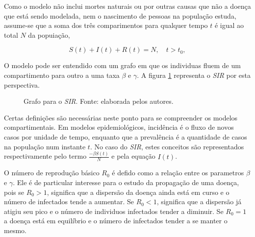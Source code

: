 Como o modelo não inclui mortes naturais ou por outras causas que não a doença
que está sendo modelada, nem o nascimento de pessoas na população estuda, assume-se
que a soma dos três comparimentos para qualquer tempo $t$ é igual ao total 
$N$ da popuiação,

\begin{equation}
   S(t) + I(t) + R(t) = N,  \quad t > t_0, \label{eq:SIR-4}
\end{equation}

O modelo pode ser entendido com um grafo em que os individuas fluem de um 
compartimento para outro a uma taxa $\beta$ e $\gamma$. 
A figura \ref{fig:sir-grafo} representa o \textit{SIR} por esta perspectiva.

\begin{figure}
\centering
{}
\caption{Grafo para o \textit{SIR}. Fonte: elaborada pelos autores.}
\label{fig:sir-grafo}
\end{figure}

Certas definições são necessárias neste ponto para se compreender os modelos compartimentais. 
Em modelos epidemiológicos, incidência é o fluxo de novos casos por unidade de tempo,
enquanto que a prevalência é a quantidade de casos na população num instante $t$.
No caso do \textit{SIR}, estes conceitos são representados respectivamente pelo
termo $\frac{-\beta S(t)}{N}$ e pela equação $I(t)$. 

O número de reprodução básico $R_0$ é defido como a relação entre os parametros
$\beta$ e $\gamma$. Ele é de particular interesse para o estudo da propagação
de uma doença, pois se $R_0 > 1$, significa que a dispersão da doença
ainda está em curso e o número de infectados tende a aumentar. 
Se $R_0 < 1$, significa que a dispersão já atigiu seu pico e o número de individuos
infectados tender a diminuir. Se $R_0 = 1$ a doença está em equilíbrio e o número 
de infectados tender a se manter o mesmo.

